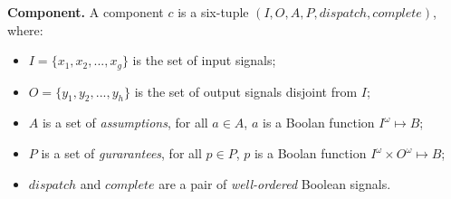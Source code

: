 {\bf Component.}
A component $c$ is a six-tuple $(I, O, A, P, dispatch, complete)$, where: 
\begin{itemize}
    	\item $I = \{x_1, x_2, ..., x_g\}$ is the set of input signals;
    	\item $O= \{y_1, y_2, ..., y_h\}$ is the set of output signals disjoint from $I$;
 	\item $A$ is a set of \emph{assumptions}, for all $a \in A$, $a$ is a Boolan function $I^{\omega} \mapsto B$;
 	\item $P$ is a set of \emph{gurarantees}, for all $p \in P$, $p$ is a Boolan function $I^{\omega} \times O^{\omega} \mapsto B$;
    	\item $dispatch$ and $complete$ are a pair of \emph{well-ordered} Boolean signals.
\end{itemize}
